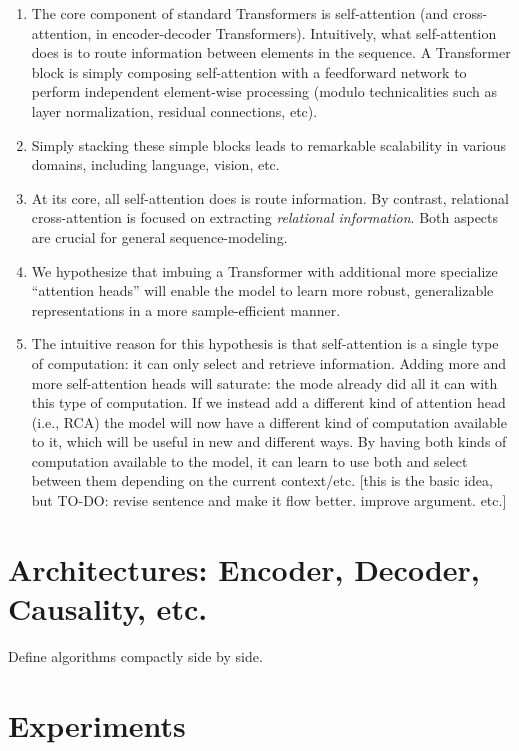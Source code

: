 \documentclass{article}
\begin{document}
\begin{enumerate}
  \item The core component of standard Transformers is self-attention (and cross-attention, in encoder-decoder Transformers). Intuitively, what self-attention does is to route information between elements in the sequence. A Transformer block is simply composing self-attention with a feedforward network to perform independent element-wise processing (modulo technicalities such as layer normalization, residual connections, etc).
  \item Simply stacking these simple blocks leads to remarkable scalability in various domains, including language, vision, etc.
  \item At its core, all self-attention does is route information. By contrast, relational cross-attention is focused on extracting \textit{relational information}. Both aspects are crucial for general sequence-modeling.
  \item We hypothesize that imbuing a Transformer with additional more specialize ``attention heads'' will enable the model to learn more robust, generalizable representations in a more sample-efficient manner.
  \item The intuitive reason for this hypothesis is that self-attention is a single type of computation: it can only select and retrieve information. Adding more and more self-attention heads will saturate: the mode already did all it can with this type of computation. If we instead add a different kind of attention head (i.e., RCA) the model will now have a different kind of computation available to it, which will be useful in new and different ways. By having both kinds of computation available to the model, it can learn to use both and select between them depending on the current context/etc. [this is the basic idea, but TO-DO: revise sentence and make it flow better. improve argument. etc.]
\end{enumerate}

\section{Architectures: Encoder, Decoder, Causality, etc.}

Define algorithms compactly side by side.

\section{Experiments}
\end{document}

